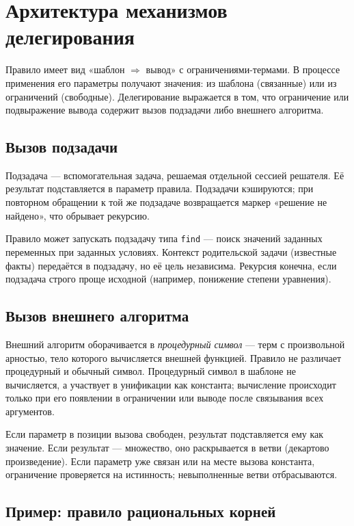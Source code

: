 \section{Архитектура механизмов делегирования}

Правило имеет вид «шаблон $\Rightarrow$ вывод» с ограничениями-термами. 
В процессе применения его параметры получают значения: из шаблона (связанные) 
или из ограничений (свободные). Делегирование выражается в том, что 
ограничение или подвыражение вывода содержит вызов подзадачи либо внешнего 
алгоритма.

\subsection{Вызов подзадачи}

Подзадача --- вспомогательная задача, решаемая отдельной сессией решателя. 
Её результат подставляется в параметр правила. Подзадачи кэшируются; 
при повторном обращении к той же подзадаче возвращается маркер 
«решение не найдено», что обрывает рекурсию.

Правило может запускать подзадачу типа \texttt{find} --- поиск значений 
заданных переменных при заданных условиях. Контекст родительской задачи 
(известные факты) передаётся в подзадачу, но её цель независима. 
Рекурсия конечна, если подзадача строго проще исходной (например, 
понижение степени уравнения).

\subsection{Вызов внешнего алгоритма}

Внешний алгоритм оборачивается в \emph{процедурный символ} --- терм 
с произвольной арностью, тело которого вычисляется внешней функцией. 
Правило не различает процедурный и обычный символ. Процедурный символ 
в шаблоне не вычисляется, а участвует в унификации как константа; 
вычисление происходит только при его появлении в ограничении или выводе 
после связывания всех аргументов.

Если параметр в позиции вызова свободен, результат подставляется ему 
как значение. Если результат --- множество, оно раскрывается в ветви 
(декартово произведение). Если параметр уже связан или на месте вызова 
константа, ограничение проверяется на истинность; невыполненные ветви 
отбрасываются.

\subsection{Пример: правило рациональных корней}

